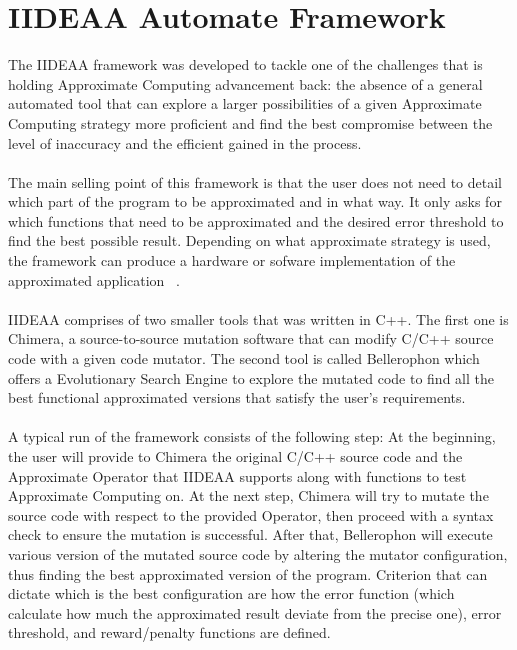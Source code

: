 \section{IIDEAA Automate Framework} 

The IIDEAA framework was developed to tackle one of the challenges that is holding Approximate Computing advancement back: the absence of a general automated tool that can explore a larger possibilities of a given Approximate Computing strategy more proficient and find the best compromise between the level of inaccuracy and the efficient gained in the process. \\
~\\
The main selling point of this framework is that the user does not need to detail which part of the program to be approximated and in what way. It only asks for which functions that need to be approximated and the desired error threshold to find the best possible result. Depending on what approximate strategy is used, the framework can produce a hardware or sofware implementation of the approximated application ~\cite{iideaa}. \\
~\\
IIDEAA comprises of two smaller tools that was written in C++. The first one is Chimera, a source-to-source mutation software that can modify C/C++ source code with a given code mutator. The second tool is called Bellerophon which offers a Evolutionary Search Engine to explore the mutated code to find all the best functional approximated versions that satisfy the user's requirements. \\
~\\
A typical run of the framework consists of the following step: At the beginning, the user will provide to Chimera the original C/C++ source code  and the Approximate Operator that IIDEAA supports along with functions to test Approximate Computing on. At the next step, Chimera will try to mutate the source code with respect to the provided Operator, then proceed with a syntax check to ensure the mutation is successful. After that, Bellerophon will execute various version of the mutated source code by altering the mutator configuration, thus finding the best approximated version of the program. Criterion that can dictate which is the best configuration are how the error function (which calculate how much the approximated result deviate from the precise one), error threshold, and reward/penalty functions are defined. \\

